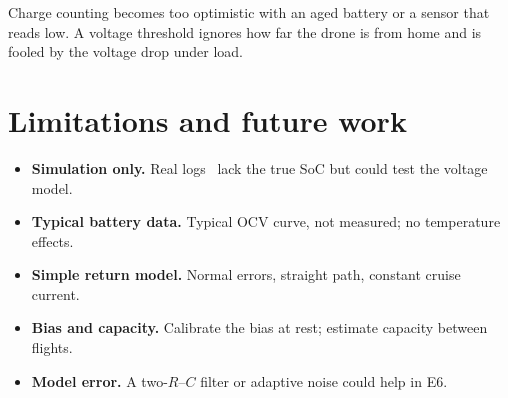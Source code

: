 Charge counting becomes too optimistic with an aged battery or a sensor that reads low. A voltage threshold ignores how far the drone is from home and is fooled by the voltage drop under load.

\section{Limitations and future work}\label{sec:d_limitations}\label{sec:d_future}

\begin{itemize}
  \item \textbf{Simulation only.} Real logs~\cite{cmu_dji_dataset} lack the true SoC but could test the voltage model.
  \item \textbf{Typical battery data.} Typical OCV curve, not measured; no temperature effects.
  \item \textbf{Simple return model.} Normal errors, straight path, constant cruise current.
  \item \textbf{Bias and capacity.} Calibrate the bias at rest; estimate capacity between flights.
  \item \textbf{Model error.} A two-$R$--$C$ filter or adaptive noise could help in E6.
\end{itemize}
